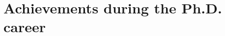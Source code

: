 \documentclass[aspectratio=169]{beamer}
\begin{document}



\section[Publications \& Presentations]{Achievements during the Ph.D. career} %

\end{document}
